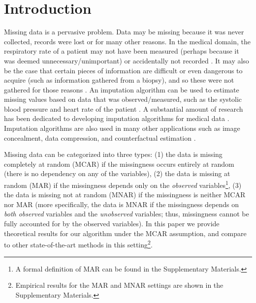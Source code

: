\documentclass{article}
\begin{document}
\section{Introduction}\label{sec:introduction}
Missing data is a pervasive problem. Data may be missing because it was never collected, records were lost or for many other reasons. In the medical domain, the respiratory rate of a patient may not have been measured (perhaps because it was deemed unnecessary/unimportant) or accidentally not recorded \cite{yoon_jbhi,ahmed_tbme}. It may also be the case that certain pieces of information are difficult or even dangerous to acquire (such as information gathered from a biopsy), and so these were not gathered for those reasons \cite{yoon_plosone}. An imputation algorithm can be used to estimate missing values based on data that was observed/measured, such as the systolic blood pressure and heart rate of the patient \cite{yoon_deep}. A substantial amount of research has been dedicated to developing imputation algorithms for medical data \cite{Medimpute1,Medimpute2,Medimpute3,Medimpute4}. Imputation algorithms are also used in many other applications such as image concealment, data compression, and counterfactual estimation \cite{Rubin,Missing_Book,yoon_ganite}. 

Missing data can be categorized into three types: (1) the data is missing completely at random (MCAR) if the missingness occurs entirely at random (there is no dependency on any of the variables), (2) the data is missing at random (MAR) if the missingness depends only on the {\em observed} variables\footnote{A formal definition of MAR can be found in the Supplementary Materials.}, (3) the data is missing not at random (MNAR) if the missingness is neither MCAR nor MAR (more specifically, the data is MNAR if the missingness depends on {\em both observed} variables and the {\em unobserved} variables; thus, missingness cannot be fully accounted for by the observed variables). In this paper we provide theoretical results for our algorithm under the MCAR assumption, and compare to other state-of-the-art methods in this setting\footnote{Empirical results for the MAR and MNAR settings are shown in the Supplementary Materials.}.
\end{document}
